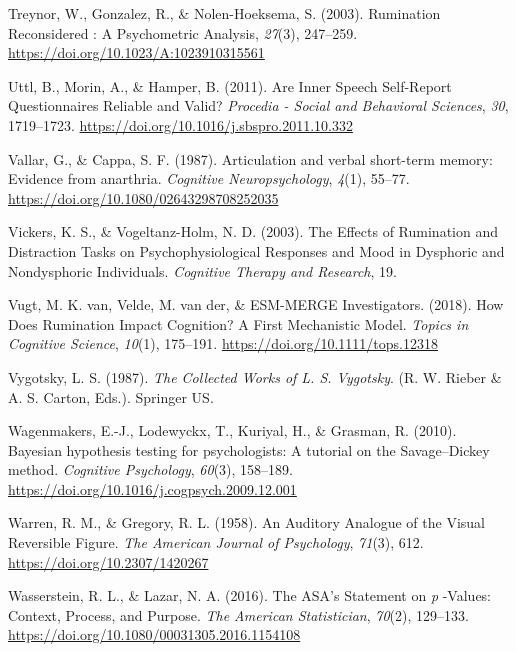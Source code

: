 \documentclass[a4paper,12pt,twoside,openright,oldfontcommands]{memoir}
\begin{document}
\leavevmode\hypertarget{ref-treynor_rumination_2003}{}%
Treynor, W., Gonzalez, R., \& Nolen-Hoeksema, S. (2003). Rumination Reconsidered : A Psychometric Analysis, \emph{27}(3), 247--259. \url{https://doi.org/10.1023/A:1023910315561}

\leavevmode\hypertarget{ref-Uttl2011}{}%
Uttl, B., Morin, A., \& Hamper, B. (2011). Are Inner Speech Self-Report Questionnaires Reliable and Valid? \emph{Procedia - Social and Behavioral Sciences}, \emph{30}, 1719--1723. \url{https://doi.org/10.1016/j.sbspro.2011.10.332}

\leavevmode\hypertarget{ref-vallar_articulation_1987}{}%
Vallar, G., \& Cappa, S. F. (1987). Articulation and verbal short-term memory: Evidence from anarthria. \emph{Cognitive Neuropsychology}, \emph{4}(1), 55--77. \url{https://doi.org/10.1080/02643298708252035}

\leavevmode\hypertarget{ref-vickers_effects_2003}{}%
Vickers, K. S., \& Vogeltanz-Holm, N. D. (2003). The Effects of Rumination and Distraction Tasks on Psychophysiological Responses and Mood in Dysphoric and Nondysphoric Individuals. \emph{Cognitive Therapy and Research}, 19.

\leavevmode\hypertarget{ref-van_vugt_how_2018}{}%
Vugt, M. K. van, Velde, M. van der, \& ESM-MERGE Investigators. (2018). How Does Rumination Impact Cognition? A First Mechanistic Model. \emph{Topics in Cognitive Science}, \emph{10}(1), 175--191. \url{https://doi.org/10.1111/tops.12318}

\leavevmode\hypertarget{ref-vygotsky_collected_1987}{}%
Vygotsky, L. S. (1987). \emph{The Collected Works of L. S. Vygotsky}. (R. W. Rieber \& A. S. Carton, Eds.). Springer US.

\leavevmode\hypertarget{ref-wagenmakers_bayesian_2010}{}%
Wagenmakers, E.-J., Lodewyckx, T., Kuriyal, H., \& Grasman, R. (2010). Bayesian hypothesis testing for psychologists: A tutorial on the Savage--Dickey method. \emph{Cognitive Psychology}, \emph{60}(3), 158--189. \url{https://doi.org/10.1016/j.cogpsych.2009.12.001}

\leavevmode\hypertarget{ref-warren_auditory_1958}{}%
Warren, R. M., \& Gregory, R. L. (1958). An Auditory Analogue of the Visual Reversible Figure. \emph{The American Journal of Psychology}, \emph{71}(3), 612. \url{https://doi.org/10.2307/1420267}

\leavevmode\hypertarget{ref-wasserstein_asas_2016}{}%
Wasserstein, R. L., \& Lazar, N. A. (2016). The ASA's Statement on \emph{p} -Values: Context, Process, and Purpose. \emph{The American Statistician}, \emph{70}(2), 129--133. \url{https://doi.org/10.1080/00031305.2016.1154108}
\end{document}
